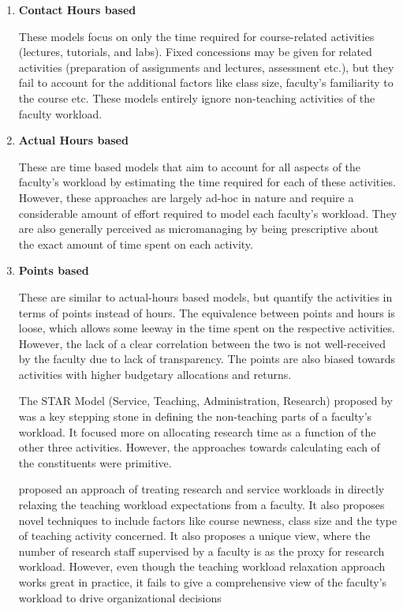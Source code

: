 \begin{enumerate}

    \item \textbf{Contact Hours based}

          These models focus on only the time required for course-related activities (lectures, tutorials, and labs). Fixed concessions may be given for related activities (preparation of assignments and lectures, assessment etc.), but they fail to account for the additional factors like class size, faculty's familiarity to the course etc. These models entirely ignore non-teaching activities of the faculty workload.

    \item \textbf{Actual Hours based}

          These are time based models that aim to account for all aspects of the faculty's workload by estimating the time required for each of these activities. However, these approaches are largely ad-hoc in nature and require a considerable amount of effort required to model each faculty's workload. They are also generally perceived as micromanaging by being prescriptive about the exact amount of time spent on each activity.

    \item \textbf{Points based}

          These are similar to actual-hours based models, but quantify the activities in terms of points instead of hours. The equivalence between points and hours is loose, which allows some leeway in the time spent on the respective activities. However, the lack of a clear correlation between the two is not well-received by the faculty due to lack of transparency. The points are also biased towards activities with higher budgetary allocations and returns.

          The STAR Model (Service, Teaching, Administration, Research) proposed by \cite{finlay1994management} was a key stepping stone in defining the non-teaching parts of a faculty's workload. It focused more on allocating research time as a function of the other three activities. However, the approaches towards calculating each of the constituents were primitive.

          \cite{rohan2017} proposed an approach of treating research and service workloads in directly relaxing the teaching workload expectations from a faculty. It also proposes novel techniques to include factors like course newness, class size and the type of teaching activity concerned. It also proposes a unique view, where the number of research staff supervised by a faculty is as the proxy for research workload. However, even though the teaching workload relaxation approach works great in practice, it fails to give a comprehensive view of the faculty's workload to drive organizational decisions


\end{enumerate}
